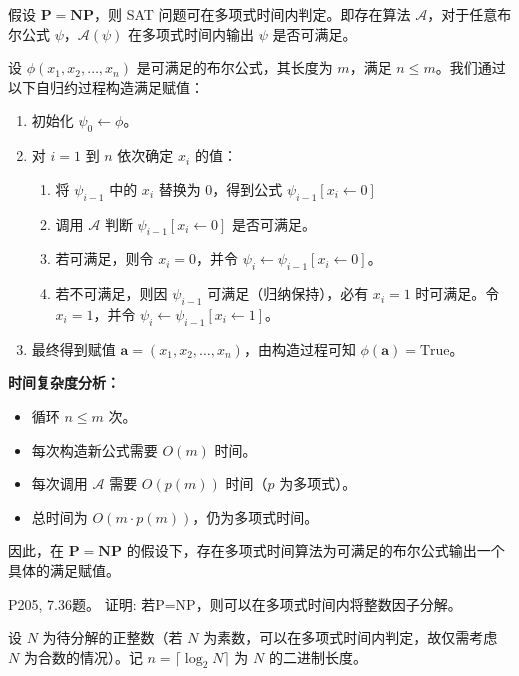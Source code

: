 \documentclass[11pt,addpoints,answers]{exam}
\begin{document}
\begin{questions}
\begin{solution}
	假设 $\mathbf{P} = \mathbf{NP}$，则 SAT 问题可在多项式时间内判定。即存在算法 $\mathcal{A}$，对于任意布尔公式 $\psi$，$\mathcal{A}(\psi)$ 在多项式时间内输出 $\psi$ 是否可满足。

    设 $\phi(x_1, x_2, \dots, x_n)$ 是可满足的布尔公式，其长度为 $m$，满足 $n \le m$。我们通过以下自归约过程构造满足赋值：
    
    \begin{enumerate}
        \item 初始化 $\psi_0 \gets \phi$。
        \item 对 $i = 1$ 到 $n$ 依次确定 $x_i$ 的值：
        \begin{enumerate}
            \item 将 $\psi_{i-1}$ 中的 $x_i$ 替换为 0，得到公式 $\psi_{i-1}[x_i \gets 0]$
            \item 调用 $\mathcal{A}$ 判断 $\psi_{i-1}[x_i \gets 0]$ 是否可满足。
            \item 若可满足，则令 $x_i = 0$，并令 $\psi_i \gets \psi_{i-1}[x_i \gets 0]$。
            \item 若不可满足，则因 $\psi_{i-1}$ 可满足（归纳保持），必有 $x_i = 1$ 时可满足。令 $x_i = 1$，并令 $\psi_i \gets \psi_{i-1}[x_i \gets 1]$。
        \end{enumerate}
        \item 最终得到赋值 $\mathbf{a} = (x_1, x_2, \dots, x_n)$，由构造过程可知 $\phi(\mathbf{a}) = \text{True}$。
    \end{enumerate}
    
    \noindent\textbf{时间复杂度分析：}
    \begin{itemize}
        \item 循环 $n \le m$ 次。
        \item 每次构造新公式需要 $O(m)$ 时间。
        \item 每次调用 $\mathcal{A}$ 需要 $O(p(m))$ 时间（$p$ 为多项式）。
        \item 总时间为 $O(m \cdot p(m))$，仍为多项式时间。
    \end{itemize}
    
    因此，在 $\mathbf{P} = \mathbf{NP}$ 的假设下，存在多项式时间算法为可满足的布尔公式输出一个具体的满足赋值。
\end{solution}


\question P205, 7.36题。
证明: 若P=NP，则可以在多项式时间内将整数因子分解。
\begin{solution}
	
    设 $N$ 为待分解的正整数（若 $N$ 为素数，可以在多项式时间内判定，故仅需考虑 $N$ 为合数的情况）。记 $n = \lceil \log_2 N \rceil$ 为 $N$ 的二进制长度。


\end{solution}
\end{questions}
\end{document}
